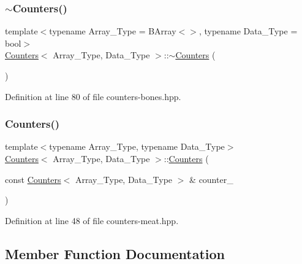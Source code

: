 \subsubsection{\texorpdfstring{$\sim$\+Counters()}{~Counters()}}
{\footnotesize\ttfamily template$<$typename Array\+\_\+\+Type = B\+Array$<$$>$, typename Data\+\_\+\+Type = bool$>$ \\
\hyperlink{class_counters}{Counters}$<$ Array\+\_\+\+Type, Data\+\_\+\+Type $>$\+::$\sim$\hyperlink{class_counters}{Counters} (\begin{DoxyParamCaption}{ }\end{DoxyParamCaption})\hspace{0.3cm}{\ttfamily [inline]}}



Definition at line 80 of file counters-\/bones.\+hpp.

\mbox{\label{class_counters_a178c0267c1f52a36e10e9d257a21a224}} 
\subsubsection{\texorpdfstring{Counters()}{Counters()}\hspace{0.1cm}{\footnotesize\ttfamily [2/2]}}
{\footnotesize\ttfamily template$<$typename Array\+\_\+\+Type, typename Data\+\_\+\+Type$>$ \\
\hyperlink{class_counters}{Counters}$<$ Array\+\_\+\+Type, Data\+\_\+\+Type $>$\+::\hyperlink{class_counters}{Counters} (\begin{DoxyParamCaption}\item[{const \hyperlink{class_counters}{Counters}$<$ Array\+\_\+\+Type, Data\+\_\+\+Type $>$ \&}]{counter\+\_\+ }\end{DoxyParamCaption})\hspace{0.3cm}{\ttfamily [inline]}}



Definition at line 48 of file counters-\/meat.\+hpp.



\subsection{Member Function Documentation}
\mbox{\label{class_counters_a5b5dafc7a3e0eedae400457f69937613}} 
